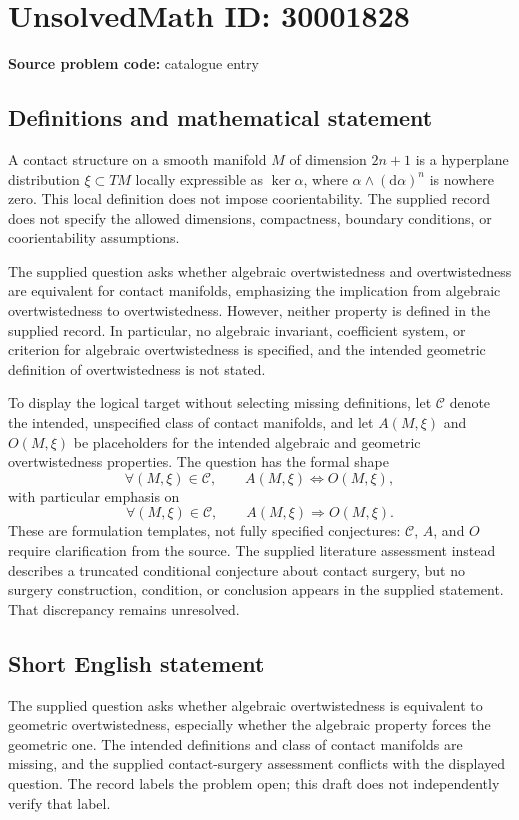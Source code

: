 \documentclass[11pt]{article}
\begin{document}
\section*{UnsolvedMath ID: 30001828}
\textbf{Source problem code:} catalogue entry
\subsection{Definitions and mathematical statement}
A contact structure on a smooth manifold \(M\) of dimension \(2n+1\) is a hyperplane distribution \(\xi\subset TM\) locally expressible as \(\ker\alpha\), where \(\alpha\wedge(\mathrm d\alpha)^n\) is nowhere zero. This local definition does not impose coorientability. The supplied record does not specify the allowed dimensions, compactness, boundary conditions, or coorientability assumptions.

The supplied question asks whether algebraic overtwistedness and overtwistedness are equivalent for contact manifolds, emphasizing the implication from algebraic overtwistedness to overtwistedness. However, neither property is defined in the supplied record. In particular, no algebraic invariant, coefficient system, or criterion for algebraic overtwistedness is specified, and the intended geometric definition of overtwistedness is not stated.

To display the logical target without selecting missing definitions, let \(\mathcal C\) denote the intended, unspecified class of contact manifolds, and let \(A(M,\xi)\) and \(O(M,\xi)\) be placeholders for the intended algebraic and geometric overtwistedness properties. The question has the formal shape
\[
\forall (M,\xi)\in\mathcal C,\qquad A(M,\xi)\Longleftrightarrow O(M,\xi),
\]
with particular emphasis on
\[
\forall (M,\xi)\in\mathcal C,\qquad A(M,\xi)\Longrightarrow O(M,\xi).
\]
These are formulation templates, not fully specified conjectures: \(\mathcal C\), \(A\), and \(O\) require clarification from the source. The supplied literature assessment instead describes a truncated conditional conjecture about contact surgery, but no surgery construction, condition, or conclusion appears in the supplied statement. That discrepancy remains unresolved.
\subsection{Short English statement}
The supplied question asks whether algebraic overtwistedness is equivalent to geometric overtwistedness, especially whether the algebraic property forces the geometric one. The intended definitions and class of contact manifolds are missing, and the supplied contact-surgery assessment conflicts with the displayed question. The record labels the problem open; this draft does not independently verify that label.
\end{document}
